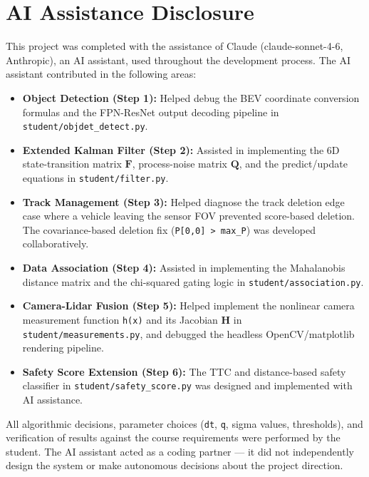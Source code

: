 \documentclass[12pt, a4paper]{article}
\begin{document}
\newpage

\section*{AI Assistance Disclosure}

This project was completed with the assistance of Claude (claude-sonnet-4-6, Anthropic),
an AI assistant, used throughout the development process.
The AI assistant contributed in the following areas:

\begin{itemize}[leftmargin=1.8em, itemsep=4pt]
  \item \textbf{Object Detection (Step 1):} Helped debug the BEV coordinate conversion
        formulas and the FPN-ResNet output decoding pipeline in \texttt{student/objdet\_detect.py}.
  \item \textbf{Extended Kalman Filter (Step 2):} Assisted in implementing the 6D
        state-transition matrix $\mathbf{F}$, process-noise matrix $\mathbf{Q}$, and the
        predict/update equations in \texttt{student/filter.py}.
  \item \textbf{Track Management (Step 3):} Helped diagnose the track deletion edge case
        where a vehicle leaving the sensor FOV prevented score-based deletion. The
        covariance-based deletion fix (\texttt{P[0,0] > max\_P}) was developed collaboratively.
  \item \textbf{Data Association (Step 4):} Assisted in implementing the Mahalanobis
        distance matrix and the chi-squared gating logic in \texttt{student/association.py}.
  \item \textbf{Camera-Lidar Fusion (Step 5):} Helped implement the nonlinear camera
        measurement function \texttt{h(x)} and its Jacobian $\mathbf{H}$ in
        \texttt{student/measurements.py}, and debugged the headless OpenCV/matplotlib
        rendering pipeline.
  \item \textbf{Safety Score Extension (Step 6):} The TTC and distance-based safety
        classifier in \texttt{student/safety\_score.py} was designed and implemented
        with AI assistance.
\end{itemize}

\noindent All algorithmic decisions, parameter choices (\texttt{dt}, \texttt{q}, sigma values,
thresholds), and verification of results against the course requirements were performed by
the student. The AI assistant acted as a coding partner --- it did not
independently design the system or make autonomous decisions about the project direction.
\end{document}
